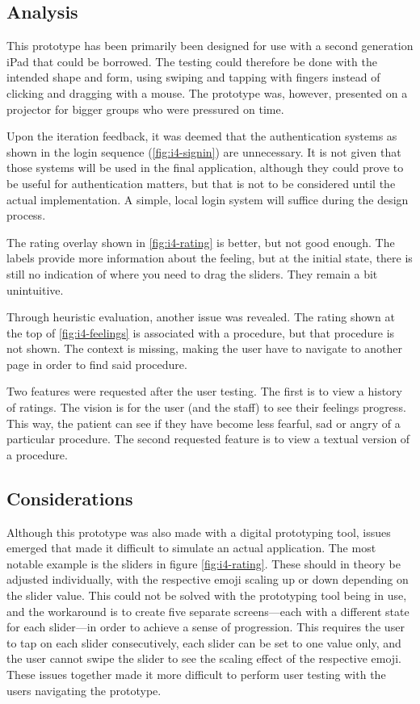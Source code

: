 \subsection{Analysis}

This prototype has been primarily been designed for use with a second generation iPad that could be borrowed. The testing could therefore be done with the intended shape and form, using swiping and tapping with fingers instead of clicking and dragging with a mouse. The prototype was, however, presented on a projector for bigger groups who were pressured on time.

Upon the iteration feedback, it was deemed that the authentication systems as shown in the login sequence (\autoref{fig:i4-signin}) are unnecessary. It is not given that those systems will be used in the final application, although they could prove to be useful for authentication matters, but that is not to be considered until the actual implementation. A simple, local login system will suffice during the design process.

The rating overlay shown in \autoref{fig:i4-rating} is better, but not good enough. The labels provide more information about the feeling, but at the initial state, there is still no indication of where you need to drag the sliders. They remain a bit unintuitive.

Through heuristic evaluation, another issue was revealed. The rating shown at the top of \autoref{fig:i4-feelings} is associated with a procedure, but that procedure is not shown. The context is missing, making the user have to navigate to another page in order to find said procedure.

Two features were requested after the user testing. The first is to view a history of ratings. The vision is for the user (and the staff) to see their feelings progress. This way, the patient can see if they have become less fearful, sad or angry of a particular procedure. The second requested feature is to view a textual version of a procedure.

\subsection{Considerations}

Although this prototype was also made with a digital prototyping tool, issues emerged that made it difficult to simulate an actual application. The most notable example is the sliders in figure \ref{fig:i4-rating}. These should in theory be adjusted individually, with the respective emoji scaling up or down depending on the slider value. This could not be solved with the prototyping tool being in use, and the workaround is to create five separate screens---each with a different state for each slider---in order to achieve a sense of progression. This requires the user to tap on each slider consecutively, each slider can be set to one value only, and the user cannot swipe the slider to see the scaling effect of the respective emoji. These issues together made it more difficult to perform user testing with the users navigating the prototype.

